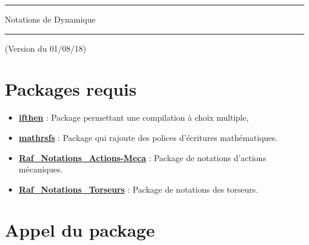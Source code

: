 \documentclass[a4paper,10pt]{article}
\begin{document}
	\begin{center}
		\hrule{\Large Notations de Dynamique}\\\hrule
	\end{center}

	(Version du 01/08/18)

	\section{Packages requis}

	\begin{itemize}
		\item \href{http://www.ctan.org/pkg/ifthen}{\textbf{ifthen}} : Package permettant une compilation à choix multiple,
		\item \href{http://www.ctan.org/pkg/mathrsfs}{\textbf{mathrsfs}} : Package qui rajoute des polices d'écritures mathématiques.
		\item \href{http://enseignement.allais.eu/page-latex}{\textbf{Raf\_Notations\_Actions-Meca}} : Package de notations d'actions mécaniques.
		\item \href{http://enseignement.allais.eu/page-latex}{\textbf{Raf\_Notations\_Torseurs}} : Package de notations des torseurs.
	\end{itemize}

	\section{Appel du package}
\end{document}
